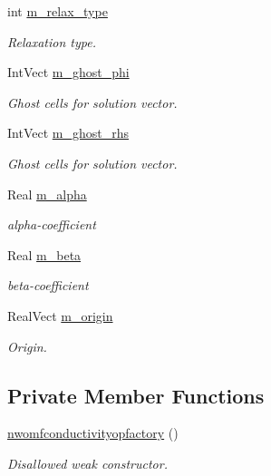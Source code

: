 \begin{DoxyCompactItemize}
int \hyperlink{classnwomfconductivityopfactory_a6253bfc07cdb0cbf628dc8deed1c7a7f}{m\+\_\+relax\+\_\+type}
\begin{DoxyCompactList}\small\item\em Relaxation type. \end{DoxyCompactList}\item 
Int\+Vect \hyperlink{classnwomfconductivityopfactory_a439703359b0e0adb71835e7266ddca5e}{m\+\_\+ghost\+\_\+phi}
\begin{DoxyCompactList}\small\item\em Ghost cells for solution vector. \end{DoxyCompactList}\item 
Int\+Vect \hyperlink{classnwomfconductivityopfactory_a9fafc9f13a6344fa81001d293091b2e0}{m\+\_\+ghost\+\_\+rhs}
\begin{DoxyCompactList}\small\item\em Ghost cells for solution vector. \end{DoxyCompactList}\item 
Real \hyperlink{classnwomfconductivityopfactory_ad41c50b105db669141185951775139ea}{m\+\_\+alpha}
\begin{DoxyCompactList}\small\item\em alpha-\/coefficient \end{DoxyCompactList}\item 
Real \hyperlink{classnwomfconductivityopfactory_ac4fbeb38df8f0519bd319d0eed706c28}{m\+\_\+beta}
\begin{DoxyCompactList}\small\item\em beta-\/coefficient \end{DoxyCompactList}\item 
Real\+Vect \hyperlink{classnwomfconductivityopfactory_af6fa637cb82676bf6d1f98758cc72291}{m\+\_\+origin}
\begin{DoxyCompactList}\small\item\em Origin. \end{DoxyCompactList}\end{DoxyCompactItemize}
\subsection*{Private Member Functions}
\begin{DoxyCompactItemize}
\item 
\hyperlink{classnwomfconductivityopfactory_a2de921ee64ec0c609313b55742050b27}{nwomfconductivityopfactory} ()
\begin{DoxyCompactList}\small\item\em Disallowed weak constructor. \end{DoxyCompactList}\end{DoxyCompactItemize}


